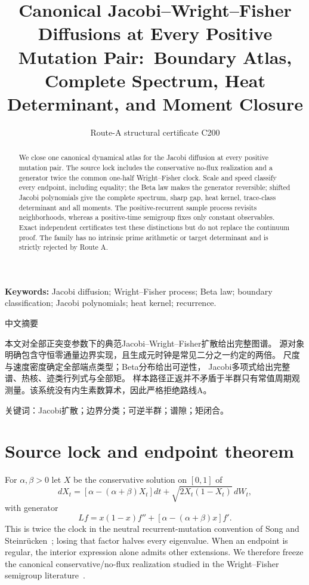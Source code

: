 \documentclass[9pt]{extarticle}
\title{Canonical Jacobi--Wright--Fisher Diffusions at Every Positive Mutation Pair:\
Boundary Atlas, Complete Spectrum, Heat Determinant, and Moment Closure}
\author{Route-A structural certificate C200}
\date{}
\begin{document}
\maketitle
\begin{abstract}
We close one canonical dynamical atlas for the Jacobi diffusion at every
positive mutation pair.  The source lock includes the conservative no-flux
realization and a generator twice the common one-half Wright--Fisher clock.
Scale and speed classify every endpoint, including equality; the Beta law
makes the generator reversible; shifted Jacobi polynomials give the complete
spectrum, sharp gap, heat kernel, trace-class determinant and all moments.
The positive-recurrent sample process revisits neighborhoods, whereas a
positive-time semigroup fixes only constant observables.  Exact independent
certificates test these distinctions but do not replace the continuum proof.
The family has no intrinsic prime arithmetic or target determinant and is
strictly rejected by Route A.
\end{abstract}
\noindent\textbf{Keywords:} Jacobi diffusion; Wright--Fisher process; Beta
law; boundary classification; Jacobi polynomials; heat kernel; recurrence.

\begin{otherlanguage}{chinese-simplified}
\begin{center}{\large 中文摘要}\end{center}
本文对全部正突变参数下的典范\foreignlanguage{english}{Jacobi--Wright--Fisher}扩散给出完整图谱。
源对象明确包含守恒零通量边界实现，且生成元时钟是常见二分之一约定的两倍。
尺度与速度密度确定全部端点类型；\foreignlanguage{english}{Beta}分布给出可逆性，
\foreignlanguage{english}{Jacobi}多项式给出完整谱、热核、迹类行列式与全部矩。
样本路径正返并不矛盾于半群只有常值周期观测量。该系统没有内生素数算术，因此严格拒绝路线\foreignlanguage{english}{A}。

\noindent 关键词：\foreignlanguage{english}{Jacobi}扩散；边界分类；可逆半群；谱隙；矩闭合。
\end{otherlanguage}

\section{Source lock and endpoint theorem}
For $\alpha,\beta>0$ let $X$ be the conservative solution on $[0,1]$ of
\begin{equation}\label{eq:sde}
 dX_t=[\alpha-(\alpha+\beta)X_t]dt+
 \sqrt{2X_t(1-X_t)}\,dW_t,
\end{equation}
with generator
\begin{equation}\label{eq:L}
 Lf=x(1-x)f''+[\alpha-(\alpha+\beta)x]f'.
\end{equation}
This is twice the clock in the neutral recurrent-mutation convention of
Song and Steinrücken~\cite{SS12}; losing that factor halves every eigenvalue.
When an endpoint is regular, the interior expression alone admits other
extensions.  We therefore freeze the canonical conservative/no-flux
realization studied in the Wright--Fisher semigroup literature~\cite{EM10}.
\end{document}
